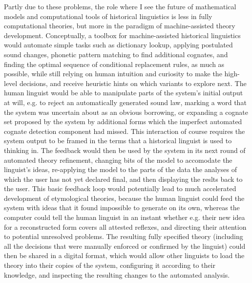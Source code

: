 Partly due to these problems, the role where I see the future of mathematical models and computational tools of historical linguistics is less in fully computational theories, but more in the paradigm of machine-assisted theory development. Conceptually, a toolbox for machine-assisted historical linguistics would automate simple tasks such as dictionary lookup, applying postulated sound changes, phonetic pattern matching to find additional cognates, and finding the optimal sequence of conditional replacement rules, as much as possible, while still relying on human intuition and curiosity to make the high-level decisions, and receive heuristic hints on which variants to explore next. The human linguist would be able to manipulate parts of the system's initial output at will, e.g. to reject an automatically generated sound law, marking a word that the system was uncertain about as an obvious borrowing, or expanding a cognate set proposed by the system by additional forms which the imperfect automated cognate 
detection component had missed. This interaction of course requires the system output to be framed in the terms that a historical linguist is used to thinking in. The feedback would then be used by the system in its next round of automated theory refinement, changing bits of the model to accomodate the linguist's ideas, re-applying the model to the parts of the data the analyses of which the user has not yet declared final, and then displaying the reslts back to the user. This basic feedback loop would potentially lead to much accelerated development of etymological theories, because the human linguist could feed the system with ideas that it found impossible to generate on its own, whereas the computer could tell the human linguist in an instant whether e.g. their new idea for a reconstructed form covers all attested reflexes, and directing their attention to potential unresolved problems. The resulting fully specified theory (including all the decisions that were manually enforced or confirmed by the 
linguist) could then be shared in a digital format, which would allow other linguists to load the theory into their copies of the system, configuring it according to their knowledge, and inspecting the resulting changes to the automated analysis.


